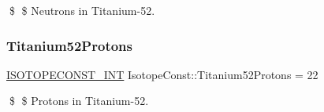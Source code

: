\$ \$ Neutrons in Titanium-\/52. \mbox{\label{group___isotope_const-_titanium-_ti52_gaa9cefde444cc14425424a920723ebf56}} 
\subsubsection{\texorpdfstring{Titanium52\+Protons}{Titanium52Protons}}
{\footnotesize\ttfamily \mbox{\hyperlink{group___isotope_const-_macros_ga5f18360b3e99483a35c32d789e62621c}{I\+S\+O\+T\+O\+P\+E\+C\+O\+N\+S\+T\+\_\+\+I\+NT}} Isotope\+Const\+::\+Titanium52\+Protons = 22}

\$ \$ Protons in Titanium-\/52. 